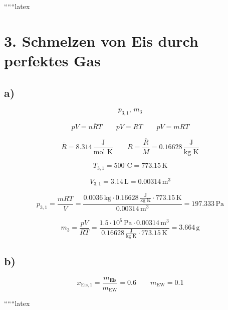 
``````latex


\section*{3. Schmelzen von Eis durch perfektes Gas}

\subsection*{a)}

\[
p_{3,1}, \, m_3
\]

\[
pV = n\overline{R}T \quad \quad pV = RT \quad \quad pV = mRT
\]

\[
\overline{R} = 8.314 \, \frac{\text{J}}{\text{mol K}} \quad \quad R = \frac{\overline{R}}{M} = 0.16628 \, \frac{\text{J}}{\text{kg K}}
\]

\[
T_{3,1} = 500^\circ \text{C} = 773.15 \, \text{K}
\]

\[
V_{3,1} = 3.14 \, \text{L} = 0.00314 \, \text{m}^3
\]

\[
p_{3,1} = \frac{mRT}{V} = \frac{0.0036 \, \text{kg} \cdot 0.16628 \, \frac{\text{J}}{\text{kg K}} \cdot 773.15 \, \text{K}}{0.00314 \, \text{m}^3} = 197.333 \, \text{Pa}
\]

\[
m_3 = \frac{pV}{RT} = \frac{1.5 \cdot 10^5 \, \text{Pa} \cdot 0.00314 \, \text{m}^3}{0.16628 \, \frac{\text{J}}{\text{kg K}} \cdot 773.15 \, \text{K}} = 3.664 \, \text{g}
\]

\subsection*{b)}

\[
x_{\text{Eis},1} = \frac{m_{\text{Eis}}}{m_{\text{EW}}} = 0.6 \quad \quad m_{\text{EW}} = 0.1
\]

``````latex


